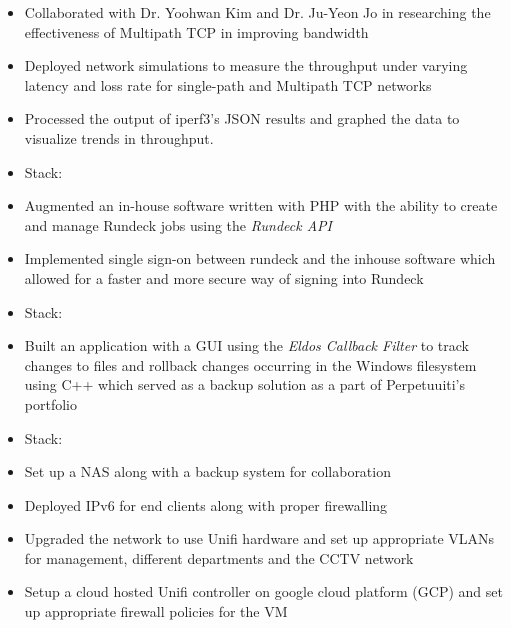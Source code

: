 

\begin{itemize}
    \item Collaborated with Dr. Yoohwan Kim and Dr. Ju-Yeon Jo in researching the effectiveness of Multipath TCP in improving bandwidth
    \item Deployed network simulations to measure the throughput under varying latency and loss rate for single-path and Multipath TCP networks  
    \item Processed the output of iperf3's JSON results and graphed the data to visualize trends in throughput.
    \item Stack:    
\end{itemize}
\divider

\begin{itemize}
    \item Augmented an in-house software written with PHP with the ability to create and manage Rundeck jobs using the \emph{Rundeck API}
    \item Implemented single sign-on between rundeck and the inhouse software which allowed for a faster and more secure way of signing into Rundeck
    \item Stack:  
\end{itemize}

\divider

\begin{itemize}
    \item Built an application with a GUI using the \emph{Eldos Callback Filter} to track changes to files and rollback changes occurring in the Windows filesystem using C++ which served as a backup solution as a part of Perpetuuiti's portfolio
    \item Stack:  
\end{itemize}
\divider

\newpage

\begin{itemize}
    \item Set up a NAS along with a backup system for collaboration
    \item Deployed IPv6 for end clients along with proper firewalling
    \item Upgraded the network to use Unifi hardware
    and set up appropriate VLANs for management, different departments and the CCTV network
    \item Setup a cloud hosted Unifi controller on google cloud platform (GCP) and set up appropriate firewall policies for the VM
\end{itemize}
